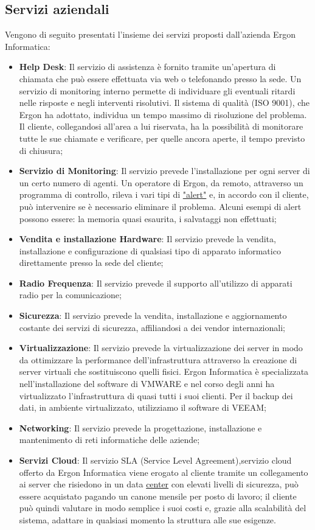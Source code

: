 \subsection{Servizi aziendali}
Vengono di seguito presentati l'insieme dei servizi proposti dall'azienda Ergon Informatica:
\begin{itemize}
	\item \textbf{Help Desk}: Il servizio di assistenza è fornito tramite un'apertura di chiamata che può essere effettuata via web o telefonando presso la sede.
	Un servizio di monitoring  interno permette di individuare gli eventuali ritardi nelle risposte e negli interventi risolutivi. Il sistema di qualità (ISO 9001), che Ergon ha adottato, individua un tempo massimo di risoluzione del problema.
	Il cliente, collegandosi all'area a lui riservata, ha la possibilità di monitorare tutte le sue chiamate e verificare, per quelle ancora aperte,
	 il tempo  previsto di chiusura;
	\item \textbf{Servizio di Monitoring}: Il servizio prevede l'installazione per ogni server di un certo numero di agenti.
	Un operatore di Ergon, da remoto, attraverso un programma di controllo, rileva i vari tipi di \hyperref[Alert]{"alert"\glosp}  e, in accordo con il cliente, 
	 può intervenire se è necessario eliminare il problema. Alcuni esempi di alert possono essere: la memoria quasi esaurita, i salvataggi non effettuati;
	\item \textbf{Vendita e installazione Hardware}: Il servizio prevede la vendita, installazione e configurazione di qualsiasi tipo di 
	apparato informatico direttamente presso la sede del cliente;
	\item \textbf{Radio Frequenza}: Il servizio prevede il supporto all'utilizzo di apparati radio per la comunicazione;
	\item \textbf{Sicurezza}: Il servizio prevede la vendita, installazione e aggiornamento costante dei servizi di sicurezza, affiliandosi a dei vendor internazionali;
	\item \textbf{Virtualizzazione}: Il servizio prevede la virtualizzazione dei server in modo da ottimizzare la performance dell'infrastruttura attraverso la creazione di server virtuali che sostituiscono quelli fisici. Ergon Informatica è specializzata nell'installazione del software di VMWARE e nel corso degli anni ha virtualizzato l'infrastruttura di quasi tutti i suoi clienti.
	Per il backup dei dati,  in ambiente virtualizzato, utilizziamo il software di VEEAM;
	\item \textbf{Networking}: Il servizio prevede la progettazione, installazione e mantenimento di reti informatiche delle aziende;
	\item \textbf{Servizi Cloud}: Il servizio SLA (Service Level Agreement),servizio cloud offerto da Ergon Informatica viene erogato al cliente tramite un
	 collegamento ai server che risiedono in un data \hyperref[Data center]{center\glosp} con elevati livelli di sicurezza, può essere acquistato pagando un canone mensile per posto di lavoro; il cliente può quindi valutare in modo semplice i suoi costi e, grazie alla scalabilità del sistema, adattare in qualsiasi momento la struttura alle sue esigenze.

\end{itemize}

